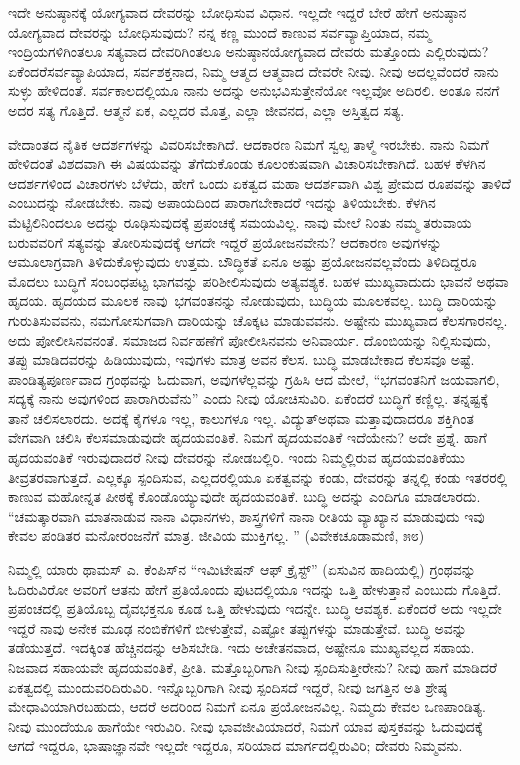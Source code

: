 ಇದೇ ಅನುಷ್ಠಾನಕ್ಕೆ ಯೋಗ್ಯವಾದ ದೇವರನ್ನು ಬೋಧಿಸುವ ವಿಧಾನ. ಇಲ್ಲದೇ ಇದ್ದರೆ ಬೇರೆ ಹೇಗೆ ಅನುಷ್ಠಾನ ಯೋಗ್ಯವಾದ ದೇವರನ್ನು ಬೋಧಿಸುವುದು? ನನ್ನ ಕಣ್ಣ ಮುಂದೆ ಕಾಣುವ ಸರ್ವವ್ಯಾಪ್ತಿಯಾದ, ನಮ್ಮ ಇಂದ್ರಿಯಗಳಿಗಿಂತಲೂ ಸತ್ಯವಾದ ದೇವರಿಗಿಂತಲೂ ಅನುಷ್ಠಾನಯೋಗ್ಯವಾದ ದೇವರು ಮತ್ತೊಂದು ಎಲ್ಲಿರುವುದು? ಏಕೆಂದರೆ\break ಸರ್ವವ್ಯಾಪಿಯಾದ, ಸರ್ವಶಕ್ತನಾದ, ನಿಮ್ಮ ಆತ್ಮದ ಆತ್ಮವಾದ ದೇವರೇ ನೀವು. ನೀವು ಅದಲ್ಲವೆಂದರೆ ನಾನು ಸುಳ್ಳು ಹೇಳಿದಂತೆ. ಸರ್ವಕಾಲದಲ್ಲಿಯೂ ನಾನು ಅದನ್ನು ಅನುಭವಿಸುತ್ತೇನೆಯೋ ಇಲ್ಲವೋ ಅದಿರಲಿ. ಅಂತೂ ನನಗೆ ಅದರ ಸತ್ಯ ಗೊತ್ತಿದೆ. ಆತ್ಮನೆ ಏಕ, ಎಲ್ಲದರ ಮೊತ್ತ, ಎಲ್ಲಾ ಜೀವನದ, ಎಲ್ಲಾ ಅಸ್ತಿತ್ವದ ಸತ್ಯ. 

ವೇದಾಂತದ ನೈತಿಕ ಆದರ್ಶಗಳನ್ನು ವಿವರಿಸಬೇಕಾಗಿದೆ. ಆದಕಾರಣ ನಿಮಗೆ ಸ್ವಲ್ಪ ತಾಳ್ಮೆ ಇರಬೇಕು. ನಾನು ನಿಮಗೆ ಹೇಳಿದಂತೆ ವಿಶದವಾಗಿ ಈ ವಿಷಯವನ್ನು ತೆಗೆದುಕೊಂಡು ಕೂಲಂಕುಷವಾಗಿ ವಿಚಾರಿಸಬೇಕಾಗಿದೆ. ಬಹಳ ಕೆಳಗಿನ ಆದರ್ಶಗಳಿಂದ ವಿಚಾರಗಳು ಬೆಳೆದು, ಹೇಗೆ ಒಂದು ಏಕತ್ವದ ಮಹಾ ಆದರ್ಶವಾಗಿ ವಿಶ್ವ ಪ್ರೇಮದ ರೂಪವನ್ನು ತಾಳಿದೆ ಎಂಬುದನ್ನು ನೋಡಬೇಕು. ನಾವು ಅಪಾಯದಿಂದ ಪಾರಾಗಬೇಕಾದರೆ ಇದನ್ನು ತಿಳಿಯಬೇಕು. ಕೆಳಗಿನ ಮೆಟ್ಟಿಲಿನಿಂದಲೂ ಅದನ್ನು ರೂಢಿಸುವುದಕ್ಕೆ  ಪ್ರಪಂಚಕ್ಕೆ ಸಮಯವಿಲ್ಲ. ನಾವು ಮೇಲೆ ನಿಂತು ನಮ್ಮ ತರುವಾಯ ಬರುವವರಿಗೆ ಸತ್ಯವನ್ನು ತೋರಿಸುವುದಕ್ಕೆ ಆಗದೇ ಇದ್ದರೆ ಪ್ರಯೋಜನವೇನು? ಆದಕಾರಣ ಅವುಗಳನ್ನು ಆಮೂಲಾಗ್ರವಾಗಿ ತಿಳಿದುಕೊಳ್ಳುವುದು ಉತ್ತಮ. ಬೌದ್ಧಿಕತೆ ಏನೂ ಅಷ್ಟು ಪ್ರಯೋಜನವಲ್ಲವೆಂದು ತಿಳಿದಿದ್ದರೂ ಮೊದಲು ಬುದ್ಧಿಗೆ ಸಂಬಂಧಪಟ್ಟ ಭಾಗವನ್ನು ಪರಿಶೀಲಿಸುವುದು ಅತ್ಯವಶ್ಯಕ. ಬಹಳ ಮುಖ್ಯವಾದುದು ಭಾವನೆ ಅಥವಾ ಹೃದಯ. ಹೃದಯದ ಮೂಲಕ ನಾವು\break\ ಭಗವಂತನನ್ನು ನೋಡುವುದು, ಬುದ್ಧಿಯ ಮೂಲಕವಲ್ಲ. ಬುದ್ಧಿ ದಾರಿಯನ್ನು ಗುರುತಿಸುವವನು, ನಮಗೋಸುಗವಾಗಿ ದಾರಿಯನ್ನು ಚೊಕ್ಕಟ ಮಾಡುವವನು. ಅಷ್ಟೇನು ಮುಖ್ಯವಾದ ಕೆಲಸಗಾರನಲ್ಲ. ಅದು ಪೋಲೀಸಿನವನಂತೆ. ಸಮಾಜದ ನಿರ್ವಹಣೆಗೆ ಪೋಲೀಸಿನವನು ಅನಿವಾರ್ಯ. ದೊಂಬಿಯನ್ನು ನಿಲ್ಲಿಸುವುದು, ತಪ್ಪು ಮಾಡಿದವರನ್ನು ಹಿಡಿಯುವುದು, ಇವುಗಳು ಮಾತ್ರ ಅವನ ಕೆಲಸ. ಬುದ್ಧಿ ಮಾಡಬೇಕಾದ ಕೆಲಸವೂ ಅಷ್ಟೆ. ಪಾಂಡಿತ್ಯಪೂರ್ಣವಾದ ಗ್ರಂಥವನ್ನು ಓದುವಾಗ, ಅವುಗಳೆಲ್ಲವನ್ನು ಗ್ರಹಿಸಿ ಆದ ಮೇಲೆ, “ಭಗವಂತನಿಗೆ ಜಯವಾಗಲಿ, ಸದ್ಯಕ್ಕೆ ನಾನು ಅವುಗಳಿಂದ ಪಾರಾಗಿರುವೆನು” ಎಂದು ನೀವು ಯೋಚಿಸುವಿರಿ. ಏಕೆಂದರೆ ಬುದ್ಧಿಗೆ ಕಣ್ಣಿಲ್ಲ. ತನ್ನಷ್ಟಕ್ಕೆ ತಾನೆ ಚಲಿಸಲಾರದು. ಅದಕ್ಕೆ ಕೈಗಳೂ ಇಲ್ಲ, ಕಾಲುಗಳೂ ಇಲ್ಲ. ವಿದ್ಯುತ್​ ಅಥವಾ ಮತ್ತಾವುದಾದರೂ ಶಕ್ತಿಗಿಂತ ವೇಗವಾಗಿ ಚಲಿಸಿ ಕೆಲಸಮಾಡುವುದೇ ಹೃದಯವಂತಿಕೆ. ನಿಮಗೆ ಹೃದಯವಂತಿಕೆ ಇದೆಯೇನು? ಅದೇ ಪ್ರಶ್ನೆ. ಹಾಗೆ ಹೃದಯವಂತಿಕೆ ಇರುವುದಾದರೆ ನೀವು ದೇವರನ್ನು ನೋಡಬಲ್ಲಿರಿ. ಇಂದು ನಿಮ್ಮಲ್ಲಿರುವ ಹೃದಯವಂತಿಕೆಯು ತೀವ್ರತರವಾಗುತ್ತದೆ. ಎಲ್ಲಕ್ಕೂ ಸ್ಪಂದಿಸುವ, ಎಲ್ಲದರಲ್ಲಿಯೂ ಏಕತ್ವವನ್ನು ಕಂಡು, ದೇವರನ್ನು ತನ್ನಲ್ಲಿ ಕಂಡು ಇತರರಲ್ಲಿ ಕಾಣುವ ಮಹೋನ್ನತ ಪೀಠಕ್ಕೆ ಕೊಂಡೊಯ್ಯುವುದೇ ಹೃದಯವಂತಿಕೆ. ಬುದ್ಧಿ ಅದನ್ನು ಎಂದಿಗೂ ಮಾಡಲಾರದು. “ಚಮತ್ಕಾರವಾಗಿ ಮಾತನಾಡುವ ನಾನಾ ವಿಧಾನಗಳು, ಶಾಸ್ತ್ರಗಳಿಗೆ ನಾನಾ ರೀತಿಯ ವ್ಯಾಖ್ಯಾನ ಮಾಡುವುದು ಇವು ಕೇವಲ ಪಂಡಿತರ ಮನೋರಂಜನೆಗೆ ಮಾತ್ರ. ಜೀವಿಯ ಮುಕ್ತಿಗಲ್ಲ. ” (ವಿವೇಕಚೂಡಾಮಣಿ, ೫೮)

ನಿಮ್ಮಲ್ಲಿ ಯಾರು ಥಾಮಸ್​ ಎ. ಕೆಂಪಿಸ್​ನ “ಇಮಿಟೇಷನ್​ ಆಫ್​ ಕ್ರೈಸ್ಟ್​” (ಏಸುವಿನ ಹಾದಿಯಲ್ಲಿ) ಗ್ರಂಥವನ್ನು ಓದಿರುವಿರೋ ಅವರಿಗೆ ಆತನು ಹೇಗೆ ಪ್ರತಿಯೊಂದು ಪುಟದಲ್ಲಿಯೂ ಇದನ್ನು ಒತ್ತಿ ಹೇಳುತ್ತಾನೆ ಎಂಬುದು ಗೊತ್ತಿದೆ. ಪ್ರಪಂಚದಲ್ಲಿ ಪ್ರತಿಯೊಬ್ಬ ದೈವಭಕ್ತನೂ ಕೂಡ ಒತ್ತಿ ಹೇಳುವುದು ಇದನ್ನೇ. ಬುದ್ಧಿ ಆವಶ್ಯಕ. ಏಕೆಂದರೆ ಅದು ಇಲ್ಲದೇ ಇದ್ದರೆ ನಾವು ಅನೇಕ ಮೂಢ ನಂಬಿಕೆಗಳಿಗೆ ಬೀಳುತ್ತೇವೆ, ಎಷ್ಟೋ ತಪ್ಪುಗಳನ್ನು ಮಾಡುತ್ತೇವೆ. ಬುದ್ಧಿ ಅವನ್ನು ತಡೆಯುತ್ತದೆ. ಇದಕ್ಕಿಂತ ಹೆಚ್ಚಿನದನ್ನು ಆಶಿಸಬೇಡಿ. ಇದು ಅಚೇತನವಾದ, ಅಷ್ಟೇನೂ ಮುಖ್ಯವಲ್ಲದ ಸಹಾಯ. ನಿಜವಾದ ಸಹಾಯವೇ ಹೃದಯವಂತಿಕೆ, ಪ್ರೀತಿ. ಮತ್ತೊಬ್ಬರಿಗಾಗಿ ನೀವು ಸ್ಪಂದಿಸುತ್ತೀರೇನು? ನೀವು ಹಾಗೆ ಮಾಡಿದರೆ ಏಕತ್ವದಲ್ಲಿ ಮುಂದುವರಿದಿರುವಿರಿ. ಇನ್ನೊಬ್ಬರಿಗಾಗಿ ನೀವು ಸ್ಪಂದಿಸದೆ ಇದ್ದರೆ, ನೀವು ಜಗತ್ತಿನ ಅತಿ ಶ್ರೇಷ್ಠ ಮೇಧಾವಿಯಾಗಿರಬಹುದು, ಆದರೆ ಅದರಿಂದ ನಿಮಗೆ ಏನೂ ಪ್ರಯೋಜನವಿಲ್ಲ. ನಿಮ್ಮದು ಕೇವಲ ಒಣಪಾಂಡಿತ್ಯ. ನೀವು ಮುಂದೆಯೂ ಹಾಗೆಯೇ ಇರುವಿರಿ. ನೀವು ಭಾವಜೀವಿಯಾದರೆ, ನಿಮಗೆ ಯಾವ ಪುಸ್ತಕವನ್ನು ಓದುವುದಕ್ಕೆ ಆಗದೆ ಇದ್ದರೂ, ಭಾಷಾಜ್ಞಾನವೇ ಇಲ್ಲದೇ ಇದ್ದರೂ, ಸರಿಯಾದ ಮಾರ್ಗದಲ್ಲಿರುವಿರಿ; ದೇವರು ನಿಮ್ಮವನು. 

